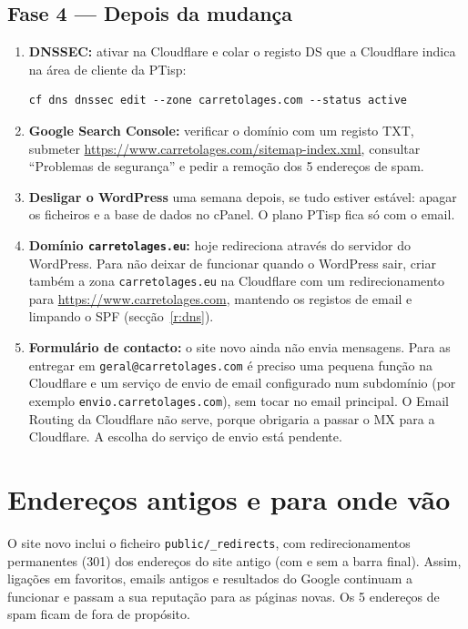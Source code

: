 \documentclass[11pt,a4paper]{article}
\begin{document}
\subsection{Fase 4 --- Depois da mudança}
\label{sec:depois}
\begin{enumerate}
  \item \textbf{DNSSEC:} ativar na Cloudflare e colar o registo DS que a Cloudflare indica na área de
        cliente da PTisp:
\begin{verbatim}
cf dns dnssec edit --zone carretolages.com --status active
\end{verbatim}
  \item \textbf{Google Search Console:} verificar o domínio com um registo TXT, submeter
        \url{https://www.carretolages.com/sitemap-index.xml}, consultar ``Problemas de segurança'' e pedir a
        remoção dos 5 endereços de spam.
  \item \textbf{Desligar o WordPress} uma semana depois, se tudo estiver estável: apagar os ficheiros e a
        base de dados no cPanel. O plano PTisp fica só com o email.
  \item \textbf{Domínio \texttt{carretolages.eu}:} hoje redireciona através do servidor do WordPress. Para
        não deixar de funcionar quando o WordPress sair, criar também a zona \texttt{carretolages.eu} na
        Cloudflare com um redirecionamento para \url{https://www.carretolages.com}, mantendo os registos de
        email e limpando o SPF (secção~\ref{r:dns}).
  \item \textbf{Formulário de contacto:} o site novo ainda não envia mensagens. Para as entregar em
        \texttt{geral@carretolages.com} é preciso uma pequena função na Cloudflare e um serviço de envio
        de email configurado num subdomínio (por exemplo \texttt{envio.carretolages.com}), sem tocar no
        email principal. O Email Routing da Cloudflare não serve, porque obrigaria a passar o MX para a
        Cloudflare. A escolha do serviço de envio está pendente.
\end{enumerate}

\appendix
\section{Endereços antigos e para onde vão}
\label{sec:redirects}

O site novo inclui o ficheiro \texttt{public/\_redirects}, com redirecionamentos permanentes (301) dos
endereços do site antigo (com e sem a barra final). Assim, ligações em favoritos, emails antigos e
resultados do Google continuam a funcionar e passam a sua reputação para as páginas novas. Os 5 endereços
de spam ficam de fora de propósito.
\end{document}
